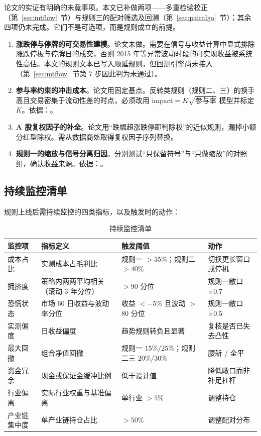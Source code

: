 论文的实证有明确的未竟事项。本文已补做两项——多重检验校正（第~\ref{sec:mtflow}~节）与规则三的配对筛选及回测（第~\ref{sec:pairalgo}~节）；其余四项仍未完成。它们不是可选项，而是规则成立的前提。

\begin{enumerate}[leftmargin=2.2em]
  \item \textbf{涨跌停与停牌的可交易性建模}。论文未做。需要在信号与收益计算中显式排除涨跌停板与停牌日的成交，否则 2015 年等异常波动时段的可实现收益被系统性高估。本文的规则文本已写入顺延规则，但回测引擎尚未接入（第~\ref{sec:mtflow}~节第 7 步因此判为未通过）。
  \item \textbf{参与率约束的冲击成本}。论文用固定基点。反转类规则（规则二、三）的换手高且交易密集于流动性差的时点，必须改用 \mbox{impact}$=K\sqrt{\text{参与率}}$ 模型并标定 $K$。依据：\cite{almgrenchriss2000,perold1988}。
  \item \textbf{A 股复权因子的补全}。论文用“跌幅超涨跌停即判除权”的近似规则，漏掉小额分红型除权。需从数据商处取得复权因子序列替换。
  \item \textbf{规则一的缩放与信号分离归因}。分别测试“只保留符号”与“只做缩放”的对照组，确认收益来源。依据：\cite{kim2016,huang2020}。
\end{enumerate}

\subsection{持续监控清单}

规则上线后需持续监控的四类指标，以及触发时的动作：

\begin{table}[htbp]
\centering\footnotesize
\caption{持续监控清单}\label{tab:monitor}
\begin{tabular}{@{}>{\raggedright\arraybackslash}p{3.4cm}>{\raggedright\arraybackslash}p{4.6cm}>{\raggedright\arraybackslash}p{3.6cm}>{\raggedright\arraybackslash}p{2.4cm}@{}}
\toprule
\textbf{监控项} & \textbf{指标定义} & \textbf{触发阈值} & \textbf{动作} \\
\midrule
成本占比 & 实测成本占毛利比 & 规则一 $>35\%$；规则二 $>40\%$ & 切换更长窗口或停机 \\
拥挤度 & 策略内两两平均相关（滚动 3 年分位） & $>90$ 分位 & 规则一敞口 $\times0.7$ \\
恐慌状态 & 市场 60 日收益与波动率分位 & 收益 $<-5\%$ 且波动 $>$80 分位 & 规则一敞口 $\times0.5$ \\
实测偏度 & 日收益偏度 & 趋势规则转负且显著 & 复核是否已失去凸性 \\
最大回撤 & 组合净值回撤 & 规则一 $15\%/25\%$；规则二三 $20\%/30\%$ & 腰斩 / 全平 \\
资金冗余 & 现金或保证金缓冲比例 & 低于设计值 & 降低敞口而非补足杠杆 \\
行业偏离 & 实际行业权重与基准偏离 & 单行业 $>5\%$ & 调整持仓 \\
产业链集中度 & 单产业链持仓占比 & $>50\%$ & 调整配对分布 \\
\bottomrule
\end{tabular}
\end{table}

